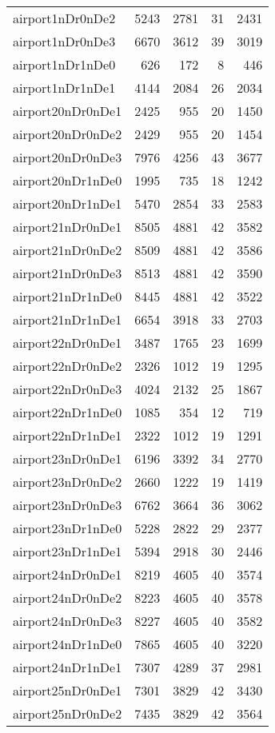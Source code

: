 \begin{longtable}{lrrrr}
airport1nDr0nDe2 & 5243 & 2781 & 31 & 2431 \\
airport1nDr0nDe3 & 6670 & 3612 & 39 & 3019 \\
airport1nDr1nDe0 & 626 & 172 & 8 & 446 \\
airport1nDr1nDe1 & 4144 & 2084 & 26 & 2034 \\
airport20nDr0nDe1 & 2425 & 955 & 20 & 1450 \\
airport20nDr0nDe2 & 2429 & 955 & 20 & 1454 \\
airport20nDr0nDe3 & 7976 & 4256 & 43 & 3677 \\
airport20nDr1nDe0 & 1995 & 735 & 18 & 1242 \\
airport20nDr1nDe1 & 5470 & 2854 & 33 & 2583 \\
airport21nDr0nDe1 & 8505 & 4881 & 42 & 3582 \\
airport21nDr0nDe2 & 8509 & 4881 & 42 & 3586 \\
airport21nDr0nDe3 & 8513 & 4881 & 42 & 3590 \\
airport21nDr1nDe0 & 8445 & 4881 & 42 & 3522 \\
airport21nDr1nDe1 & 6654 & 3918 & 33 & 2703 \\
airport22nDr0nDe1 & 3487 & 1765 & 23 & 1699 \\
airport22nDr0nDe2 & 2326 & 1012 & 19 & 1295 \\
airport22nDr0nDe3 & 4024 & 2132 & 25 & 1867 \\
airport22nDr1nDe0 & 1085 & 354 & 12 & 719 \\
airport22nDr1nDe1 & 2322 & 1012 & 19 & 1291 \\
airport23nDr0nDe1 & 6196 & 3392 & 34 & 2770 \\
airport23nDr0nDe2 & 2660 & 1222 & 19 & 1419 \\
airport23nDr0nDe3 & 6762 & 3664 & 36 & 3062 \\
airport23nDr1nDe0 & 5228 & 2822 & 29 & 2377 \\
airport23nDr1nDe1 & 5394 & 2918 & 30 & 2446 \\
airport24nDr0nDe1 & 8219 & 4605 & 40 & 3574 \\
airport24nDr0nDe2 & 8223 & 4605 & 40 & 3578 \\
airport24nDr0nDe3 & 8227 & 4605 & 40 & 3582 \\
airport24nDr1nDe0 & 7865 & 4605 & 40 & 3220 \\
airport24nDr1nDe1 & 7307 & 4289 & 37 & 2981 \\
airport25nDr0nDe1 & 7301 & 3829 & 42 & 3430 \\
airport25nDr0nDe2 & 7435 & 3829 & 42 & 3564 \\

\end{longtable}

